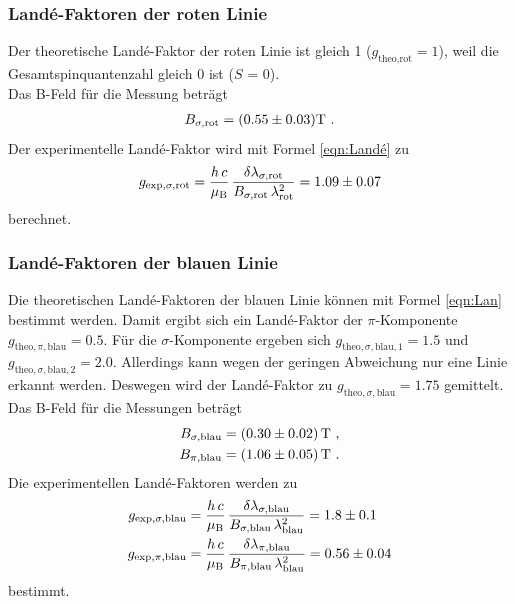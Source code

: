 \subsubsection{Landé-Faktoren der roten Linie}
Der theoretische Landé-Faktor der roten Linie ist gleich 1 ($g_\text{theo,rot} = 1$), weil die Gesamtspinquantenzahl gleich 0 ist ($S$ = 0). \\
Das B-Feld für die Messung beträgt
\begin{align*}
  B_{\sigma,\text{rot}} = (\num{0.55 +- 0.03}) \text{T} \ .
\end{align*}
Der experimentelle Landé-Faktor wird mit Formel \eqref{eqn:Landé} zu
\begin{align*}
  g_{\text{exp},\sigma,\text{rot}} = \frac{h\,c}{\mu_\text{B}}\,\frac{\delta \lambda_{\sigma,\text{rot}}}{B_{\sigma,\text{rot}}\,\lambda_\text{rot}^2} = \num{1.09 +- 0.07}
\end{align*}
berechnet.



\subsubsection{Landé-Faktoren der blauen Linie}
Die theoretischen Landé-Faktoren der blauen Linie können mit Formel \eqref{eqn:Lan} bestimmt werden. Damit ergibt sich ein Landé-Faktor der $\pi$-Komponente $g_{\text{theo},\pi,\text{blau}} = 0.5$. Für die $\sigma$-Komponente ergeben sich $g_{\text{theo},\sigma,\text{blau},1} = 1.5$ und $g_{\text{theo},\sigma,\text{blau},2} = 2.0$. Allerdings kann wegen der geringen Abweichung nur eine Linie erkannt werden. Deswegen wird der Landé-Faktor zu $g_{\text{theo},\sigma,\text{blau}} = 1.75$ gemittelt.
Das B-Feld für die Messungen beträgt
\begin{align*}
  B_{\sigma,\text{blau}} = (\num{0.3 +- 0.02})\, \text{T}\ , \\
  B_{\pi,\text{blau}} = (\num{1.06 +- 0.05})\, \text{T}\ .
\end{align*}
Die experimentellen Landé-Faktoren werden zu
\begin{align*}
  g_{\text{exp},\sigma,\text{blau}} &= \frac{h\,c}{\mu_\text{B}}\,\frac{\delta \lambda_{\sigma,\text{blau}}}{B_{\sigma,\text{blau}}\,\lambda_\text{blau}^2} = \num{1.8 +- 0.1} \\
  g_{\text{exp},\pi,\text{blau}} &= \frac{h\,c}{\mu_\text{B}}\,\frac{\delta \lambda_{\pi,\text{blau}}}{B_{\pi,\text{blau}}\,\lambda_\text{blau}^2} = \num{0.56 +- 0.04}
\end{align*}
bestimmt.

